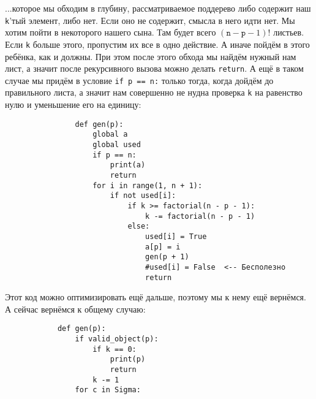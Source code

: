\documentclass{article}
\begin{document}
\begin{itemize}
\begin{Comment}
\begin{center}
            \end{center}
            ...которое мы обходим в глубину, рассматриваемое поддерево либо содержит наш \texttt{k}'тый элемент, либо нет. Если оно не содержит, смысла в него идти нет. Мы хотим пойти в некоторого нашего сына. Там будет всего $(\texttt{n}-\texttt{p}-1)!$ листьев. Если \texttt{k} больше этого, пропустим их все в одно действие. А иначе пойдём в этого ребёнка, как и должны. При этом после этого обхода мы найдём нужный нам лист, а значит после рекурсивного вызова можно делать \texttt{return}. А ещё в таком случае мы придём в условие \texttt{if p == n:} только тогда, когда дойдём до правильного листа, а значит нам совершенно не нудна проверка \texttt{k} на равенство нулю и уменьшение его на единицу:
            \begin{verbatim}
                def gen(p):
                    global a
                    global used
                    if p == n:
                        print(a)
                        return
                    for i in range(1, n + 1):
                        if not used[i]:
                            if k >= factorial(n - p - 1):
                                k -= factorial(n - p - 1)
                            else:
                                used[i] = True
                                a[p] = i
                                gen(p + 1)
                                #used[i] = False  <-- Бесполезно
                                return
            \end{verbatim}
            Этот код можно оптимизировать ещё дальше, поэтому мы к нему ещё вернёмся. А сейчас вернёмся к общему случаю:
            \begin{verbatim}
            def gen(p):
                if valid_object(p):
                    if k == 0:
                        print(p)
                        return
                    k -= 1
                for c in Sigma:

\end{verbatim}
\end{Comment}
\end{itemize}
\end{document}
